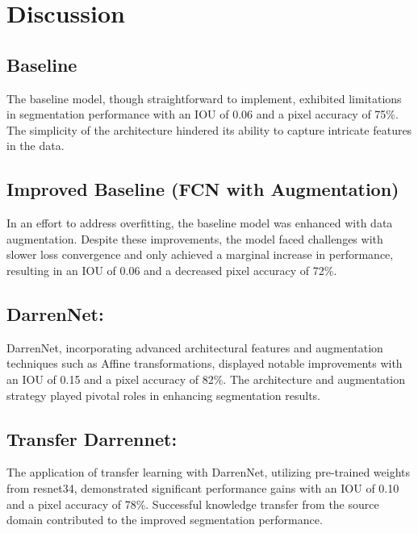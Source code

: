 \section*{Discussion}

\subsection*{Baseline}
The baseline model, though straightforward to implement, exhibited limitations in segmentation performance with an IOU of 0.06 and a pixel accuracy of 75\%. The simplicity of the architecture hindered its ability to capture intricate features in the data.

\subsection*{Improved Baseline (FCN with Augmentation)}
In an effort to address overfitting, the baseline model was enhanced with data augmentation. Despite these improvements, the model faced challenges with slower loss convergence and only achieved a marginal increase in performance, resulting in an IOU of 0.06 and a decreased pixel accuracy of 72\%.

\subsection*{DarrenNet:}
DarrenNet, incorporating advanced architectural features and augmentation techniques such as Affine transformations, displayed notable improvements with an IOU of 0.15 and a pixel accuracy of 82\%. The architecture and augmentation strategy played pivotal roles in enhancing segmentation results.

\subsection*{Transfer Darrennet:}
The application of transfer learning with DarrenNet, utilizing pre-trained weights from resnet34, demonstrated significant performance gains with an IOU of 0.10 and a pixel accuracy of 78\%. Successful knowledge transfer from the source domain contributed to the improved segmentation performance.

